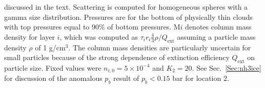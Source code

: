 \documentclass[article,11pt]{emulateapj}
\begin{document}
\begin{table*}[!htb]
\begin{small}
{  discussed in the text.  Scattering is computed for homogeneous
  spheres with a gamma size distribution. Pressures are for the bottom
  of physically thin clouds with top pressures equal to 90\% of bottom
  pressures. M$i$ denotes column mass density for layer $i$, which
  was computed as $\tau_i r_i\frac{4}{3}\rho/Q_\mathrm{ext}$ assuming
a particle mass density $\rho$ of 1 g/cm$^3$.  The column mass densities are
particularly uncertain for small particles because of the strong dependence
of extinction efficiency $Q_\mathrm{ext}$ on particle size.  Fixed
  values were $n_{i,0} = 5\times10^{-4}$ and $K_2=20$. See Sec.\ \ref{Sec:nh3ice} for
discussion of the anomalous $p_b$ result of $p_b < 0.15$ bar for location 2.}
\end{small}
\end{table*}
\end{document}
